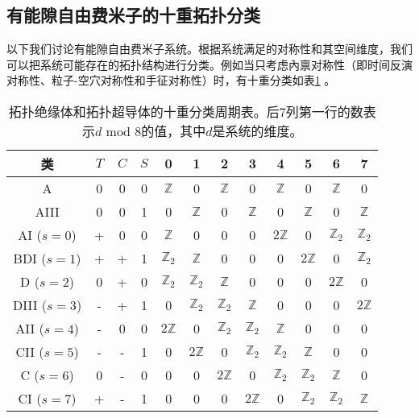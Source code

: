 \subsection{有能隙自由费米子的十重拓扑分类}
\label{tenfoldway}
以下我们讨论有能隙自由费米子系统。根据系统满足的对称性和其空间维度，我们可以把系统可能存在的拓扑结构进行分类。例如当只考虑內禀对称性（即时间反演对称性、粒子-空穴对称性和手征对称性）时，有十重分类如表\ref{tab:tenfoldway} \cite{Ryu2010}。%
\begin{table}[htb]
    \centering\small
    \caption{拓扑绝缘体和拓扑超导体的十重分类周期表。后7列第一行的数表示$d\text{ mod } 8$的值，其中$d$是系统的维度。}
    \label{tab:tenfoldway}
    \begin{tabular}{cccccccccccc}
    \toprule
    类 & $T$ & $C$ & $S$ & 0 & 1 & 2 & 3 & 4 & 5 & 6 & 7 \\
    \midrule
    A & 0 & 0 & 0 & $\mathbb{Z}$ & 0 & $\mathbb{Z}$ & 0 & $\mathbb{Z}$ & 0 & $\mathbb{Z}$ & 0\\
    AIII & 0 & 0 & 1 & 0 & $\mathbb{Z}$ & 0 & $\mathbb{Z}$ & 0 & $\mathbb{Z}$ & 0 & $\mathbb{Z}$ \\
    \hline
    AI ($s=0$) & + & 0 & 0 & $\mathbb{Z}$ & 0 & 0 & 0 & $2\mathbb{Z}$ & 0 & $\mathbb{Z}_{2}$ & $\mathbb{Z}_{2}$ \\
    BDI ($s=1$) & + & + & 1 & $\mathbb{Z}_{2}$ & $\mathbb{Z}$ & 0 & 0 & 0 & $2\mathbb{Z}$ & 0 & $\mathbb{Z}_{2}$ \\
    D ($s=2$) & 0 & + & 0 & $\mathbb{Z}_{2}$ & $\mathbb{Z}_{2}$ & $\mathbb{Z}$ & 0 & 0 & 0 & $2\mathbb{Z}$ & 0 \\
    DIII ($s=3$) & - & + & 1 & 0 & $\mathbb{Z}_{2}$ & $\mathbb{Z}_{2}$ & $\mathbb{Z}$ & 0 & 0 & 0 & $2 \mathbb{Z}$ \\
    AII ($s=4$) & - & 0 & 0 & $2\mathbb{Z}$ & 0 & $\mathbb{Z}_{2}$ & $\mathbb{Z}_{2}$ & $\mathbb{Z}$ & 0 & 0 & 0 \\
    CII ($s=5$) & - & - & 1 & 0 & $2\mathbb{Z}$ & 0 & $\mathbb{Z}_{2}$ & $\mathbb{Z}_{2}$ & $\mathbb{Z}$ & 0 & 0 \\
    C ($s=6$) & 0 & - & 0 & 0 & 0 & $2 \mathbb{Z}$ & 0 & $\mathbb{Z}_{2}$ & $\mathbb{Z}_{2}$ & $\mathbb{Z}$ & 0 \\
    CI ($s=7$) & + & - & 1 & 0 & 0 & 0 & $2 \mathbb{Z}$ & 0 & $\mathbb{Z}_{2}$ & $\mathbb{Z}_{2}$ & $\mathbb{Z}$ \\
    \bottomrule    
    \end{tabular}
\end{table}
